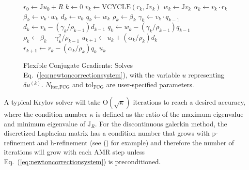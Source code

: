 \begin{figure}[ht!]
  \begin{algorithm}[H]
    \caption{\label{alg:FCG}
    Flexible Conjugate Gradients: Solves Eq.~(\ref{eq:newtoncorrectionsystem}), with the variable $u$ representing $\delta u^{(k)}$. $N_{\text{iter,FCG}}$ and $\text{tol}_{\text{FCG}}$ are user-specified parameters.}%
    \begin{algorithmic}[1]
      \State $r_0 \leftarrow \mathrm{J}u_0 + R$
      \State $k \leftarrow 0$
      \State $v_k \leftarrow \text{VCYCLE}(r_k,\mathrm{J}v_k)$
      \State $w_k \leftarrow \mathrm{J}v_k$
      \State $\alpha_k \leftarrow v_k \cdot r_k$ 
      \State $\beta_k \leftarrow v_k \cdot w_k$
      \State $d_k \leftarrow v_k$
      \State $q_k \leftarrow w_k$
      \State $\rho_k \leftarrow \beta_k$
      \Else
      \State $\gamma_k \leftarrow v_k \cdot q_{k-1}$
      \State $d_k \leftarrow v_k - (\gamma_k/\rho_{k-1})d_{k-1}$
      \State $q_k \leftarrow w_k - (\gamma_k/\rho_{k-1})q_{k-1}$
      \State $\rho_k \leftarrow \beta_k - \gamma^2_k/\rho_{k-1}$
      \EndIf
      \State $u_{k+1} \leftarrow u_k + (\alpha_k/\rho_k)d_k$
      \State $r_{k+1} \leftarrow r_k - (\alpha_k/\rho_k)q_k$
      \EndWhile
      \State \Return $u_k$
      \EndFunction
    \end{algorithmic}
  \end{algorithm}
\end{figure}

A typical Krylov solver will take $\mathrm{O}(\sqrt{\kappa})$
iterations to reach a desired accuracy, where the condition number
$\kappa$ is defined as the ratio of the maximum eigenvalue and minimum
eigenvalue of $\mathrm{J}_R$. For the  discontinuous
galerkin method, the discretized Laplacian matrix has a condition
number that grows with p-refinement and h-refinement (see (\cite{antonietti2011class,hesthaven2008nodal}) for example) and therefore the number of iterations will grow with each AMR step unless Eq.~(\ref{eq:newtoncorrectionsystem}) is preconditioned.



